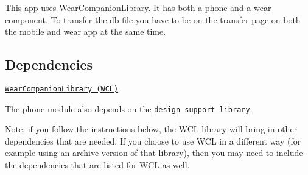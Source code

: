 This app uses Wear\+Companion\+Library. It has both a phone and a wear component. To transfer the db file you have to be on the transfer page on both the mobile and wear app at the same time.

\subsection*{Dependencies}


\begin{DoxyItemize}
\item \href{https://github.com/googlesamples/android-WearCompanionLibrary}{\tt Wear\+Companion\+Library (W\+CL)}
\item The phone module also depends on the \href{http://android-developers.blogspot.com/2015/05/android-design-support-library.html}{\tt design support library}.
\item Note\+: if you follow the instructions below, the W\+CL library will bring in other dependencies that are needed. If you choose to use W\+CL in a different way (for example using an archive version of that library), then you may need to include the dependencies that are listed for W\+CL as well. 
\end{DoxyItemize}